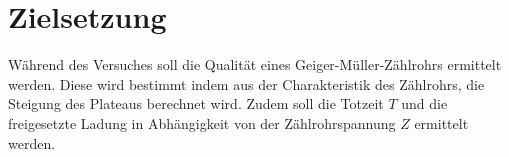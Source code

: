 \section{Zielsetzung}
\label{sec:zielsetzung}
Während des Versuches soll die Qualität eines Geiger-Müller-Zählrohrs ermittelt werden.
Diese wird bestimmt indem aus der Charakteristik des Zählrohrs, die Steigung des Plateaus berechnet wird.
Zudem soll die Totzeit $T$ und die freigesetzte Ladung in Abhängigkeit von der Zählrohrspannung $Z$ ermittelt werden.